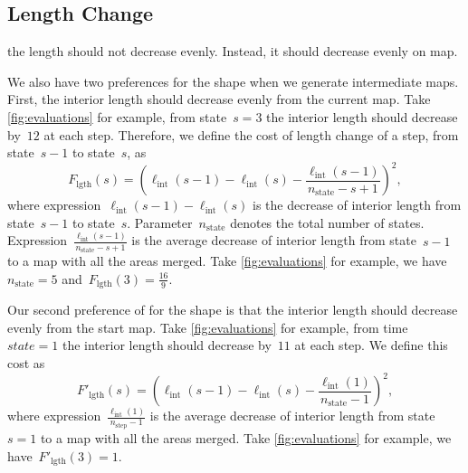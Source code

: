 \documentclass[ijgi,article,submit,moreauthors,pdftex]{Definitions/mdpi}
\begin{document}
\subsection{Length Change}

{\color{red}the length should not decrease evenly. 
Instead, it should decrease evenly on map.}

We also have two preferences for the shape when we generate intermediate maps.
First, the interior length should decrease evenly from the current map.
Take \fig\ref{fig:evaluations} for example, 
from state~$s=3$ the interior length should decrease by~$12$ at each step.
Therefore, we define the cost of length change of a step,
from state~$s-1$ to state~$s$, as
\begin{equation}
\label{eq:F_lgth}
F_\mathrm{lgth}(s)=
    \left(\ell_\mathrm{int}(s-1)-\ell_\mathrm{int}(s)-
        \frac{\ell_\mathrm{int}(s-1)}{n_\mathrm{state}-s+1}\right)^2,
\end{equation}
where expression~$\ell_\mathrm{int}(s-1)-\ell_\mathrm{int}(s)$ 
is the decrease of interior length from state~$s-1$ to state~$s$.
Parameter~$n_\mathrm{state}$ denotes the total number of states.
Expression~$\frac{\ell_\mathrm{int}(s-1)}{n_\mathrm{state}-s+1}$
is the average decrease of interior length from state~$s-1$ 
to a map with all the areas merged.
Take \fig\ref{fig:evaluations} for example,
we have~$n_\mathrm{state}=5$ and~$F_\mathrm{lgth}(3)=\frac{16}{9}$.


Our second preference of for the shape is that
the interior length should decrease evenly from the start map. 
Take \fig\ref{fig:evaluations} for example, 
from time~$state=1$ the interior length should decrease by~$11$ at each step.
We define this cost as
\begin{equation}
\label{eq:F_lgth_prime}
F'_\mathrm{lgth}(s)=
\left(\ell_\mathrm{int}(s-1)-\ell_\mathrm{int}(s)-
        \frac{\ell_\mathrm{int}(1)}{n_\mathrm{state}-1}\right)^2,
\end{equation}
where expression~$\frac{\ell_\mathrm{int}(1)}{n_\mathrm{step}-1}$
is the average decrease of interior length from state~$s=1$ 
to a map with all the areas merged.
Take \fig\ref{fig:evaluations} for example,
we have~$F'_\mathrm{lgth}(3)=1$.
\end{document}
